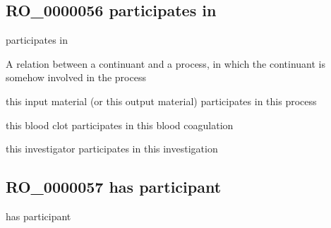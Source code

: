 \documentclass[letterpaper,10pt,english]{sphinxmanual}
\begin{document}
\subsection{RO\_0000056 \sphinxhyphen{} participates in}
\label{\detokenize{doc-RO_0000056:ro-0000056-participates-in}}\label{\detokenize{doc-RO_0000056:index-0}}\label{\detokenize{doc-RO_0000056::doc}}
\begin{sphinxShadowBox}

\sphinxAtStartPar
participates in
\end{sphinxShadowBox}

\begin{sphinxShadowBox}

\sphinxAtStartPar
{}
\end{sphinxShadowBox}

\begin{sphinxShadowBox}

\sphinxAtStartPar
A relation between a continuant and a process, in which the continuant is somehow involved in the process
\end{sphinxShadowBox}

\begin{sphinxShadowBox}

\sphinxAtStartPar
this input material (or this output material) participates in this process

\sphinxAtStartPar
this blood clot participates in this blood coagulation

\sphinxAtStartPar
this investigator participates in this investigation
\end{sphinxShadowBox}

\begin{sphinxShadowBox}

\sphinxAtStartPar
{}
\end{sphinxShadowBox}
\begin{quote}

\ignorespaces \end{quote}


\subsection{RO\_0000057 \sphinxhyphen{} has participant}
\label{\detokenize{doc-RO_0000057:ro-0000057-has-participant}}\label{\detokenize{doc-RO_0000057:index-0}}\label{\detokenize{doc-RO_0000057::doc}}
\begin{sphinxShadowBox}

\sphinxAtStartPar
has participant
\end{sphinxShadowBox}
\end{document}
